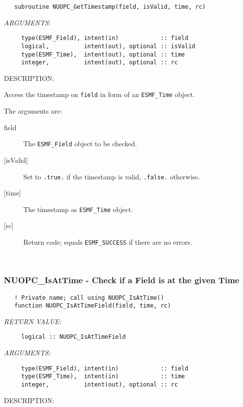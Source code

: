 \begin{verbatim}   subroutine NUOPC_GetTimestamp(field, isValid, time, rc)\end{verbatim}{\em ARGUMENTS:}
\begin{verbatim}     type(ESMF_Field), intent(in)            :: field
     logical,          intent(out), optional :: isValid
     type(ESMF_Time),  intent(out), optional :: time
     integer,          intent(out), optional :: rc\end{verbatim}
{\sf DESCRIPTION:\\ }


     Access the timestamp on {\tt field} in form of an {\tt ESMF\_Time} object.
  
     The arguments are:
     \begin{description}
     \item[field]
       The {\tt ESMF\_Field} object to be checked.
     \item[{[isValid]}]
       Set to {\tt .true.} if the timestamp is valid, {\tt .false.} otherwise.
     \item[{[time]}]
       The timestamp as {\tt ESMF\_Time} object.
     \item[{[rc]}]
       Return code; equals {\tt ESMF\_SUCCESS} if there are no errors.
     \end{description}
   
 
\mbox{}\hrulefill\ 
 
\subsubsection [NUOPC\_IsAtTime] {NUOPC\_IsAtTime - Check if a Field is at the given Time}


\begin{verbatim}   ! Private name; call using NUOPC_IsAtTime()
   function NUOPC_IsAtTimeField(field, time, rc)\end{verbatim}{\em RETURN VALUE:}
\begin{verbatim}     logical :: NUOPC_IsAtTimeField\end{verbatim}{\em ARGUMENTS:}
\begin{verbatim}     type(ESMF_Field), intent(in)            :: field
     type(ESMF_Time),  intent(in)            :: time
     integer,          intent(out), optional :: rc\end{verbatim}
{\sf DESCRIPTION:\\ }


